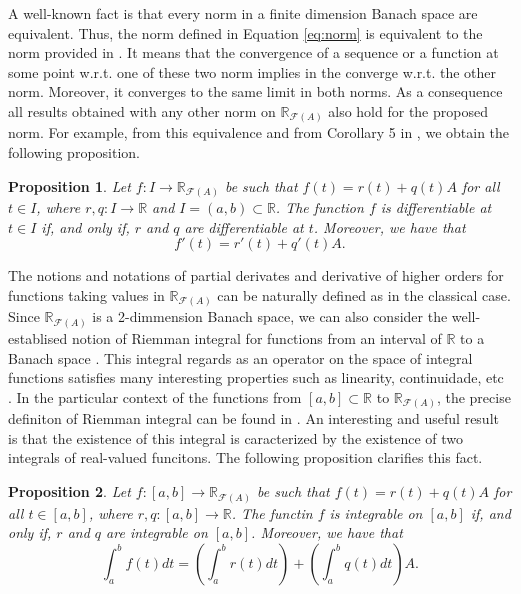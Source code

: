 \documentclass[12pt,a4paper]{article}
\newcommand{\RR}{\mathbb{R}}
\newcommand{\RFA}{\mathbb{R}_{\mathcal{F}(A)}}
\newtheorem{proposition}{Proposition}
\begin{document}
A well-known fact is that every norm in a finite dimension Banach space are equivalent. 
Thus, the norm defined in Equation \eqref{eq:norm} is equivalent to the norm provided in \cite{esmi2018frechet}. It means that the convergence of a sequence or a function at some point w.r.t. one of these two norm implies in the converge w.r.t. the other norm. Moreover, it converges to the same limit in both norms. As a consequence all results obtained with any other norm on $\RFA$ also hold for the proposed norm.  For example, from this equivalence and from Corollary 5 in \cite{esmi2020calculus}, we obtain the following proposition. 

\begin{proposition}\label{prop:derivative}
Let $f:I\to \RFA$ be such that $f(t) = r(t) + q(t)A$ for all $t\in I$, where $r,q:I\to \RR$ and $I=(a,b) \subset \RR$. The function $f$ is differentiable at $t \in I$ if, and only if, $r$ and $q$ are differentiable at $t$. Moreover, we have that 
\begin{equation}
f'(t) = r'(t) + q'(t)A.     
\end{equation}
\end{proposition}

The notions and notations of partial derivates and derivative of higher orders for functions taking values in $\RFA$ can be naturally defined as in the classical case. 
Since $\RFA$ is a 2-dimmension Banach space, we can also consider the well-establised notion of Riemman integral for functions from an interval of $\RR$ to a Banach space \cite{gordon79}. This integral regards as an operator on the space of integral functions satisfies many interesting properties such as linearity, continuidade, etc \cite{gordon79}. 
In the particular context of the functions from $[a,b]\subset \RR$ to $\RFA$, 
the precise definiton of Riemman integral can be found in 
 \cite{santo2020calculus,simoes2023interactive}. 
 An interesting and useful result is that the existence of this integral is caracterized by the existence of two integrals of real-valued funcitons. The following proposition clarifies this fact. 

\begin{proposition}\cite{santo2020calculus} \label{prop:integral}
Let $f:[a,b]\to \RFA$ be such that $f(t) = r(t) + q(t)A$ for all $t\in [a,b]$, where $r,q:[a,b]\to \RR$. The functin $f$ is integrable on $[a,b]$ if, and only if, $r$ and $q$ are integrable on $[a,b]$. Moreover, we have that 
\begin{equation}
\int_a^b f(t)dt = \left(\int_a^b r(t)dt\right) + \left(\int_a^b q(t)dt\right)A.     
\end{equation}
\end{proposition}
\end{document}
